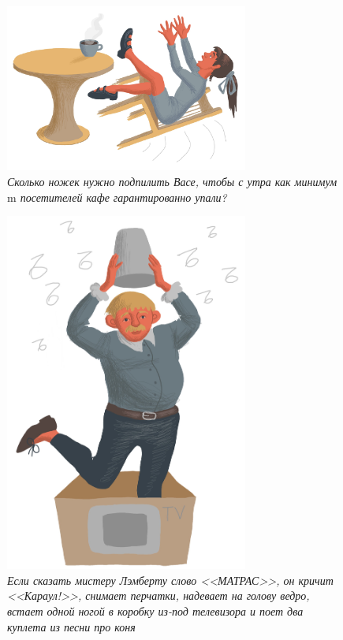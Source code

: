 \documentclass[10pt]{scrbook} \usepackage{modules/nonstahp_book}
\begin{document}
\begin{figure} \begin{center}
	\includegraphics[width=8cm]{figures/color/05c.jpg}
	\vspace{0.2cm}
	\caption{
             {\itshape  Сколько ножек нужно подпилить Васе, 
              чтобы с утра как минимум $\mathrm{m}$ посетителей кафе гарантированно упали? }\medskip\\
             }
\end{center} \end{figure}


\begin{figure} \begin{center}
	\includegraphics[width=8cm]{figures/color/09c.jpg}
	\vspace{1cm}
	\caption{
             {\itshape  Если сказать мистеру Лэмберту слово <<МАТРАС>>, он кричит <<Караул!>>, 
              снимает перчатки, надевает на голову ведро, встает одной ногой в коробку 
              из-под телевизора и поет два куплета из песни про коня }\medskip\\
             }
\end{center} \end{figure}
\end{document}
